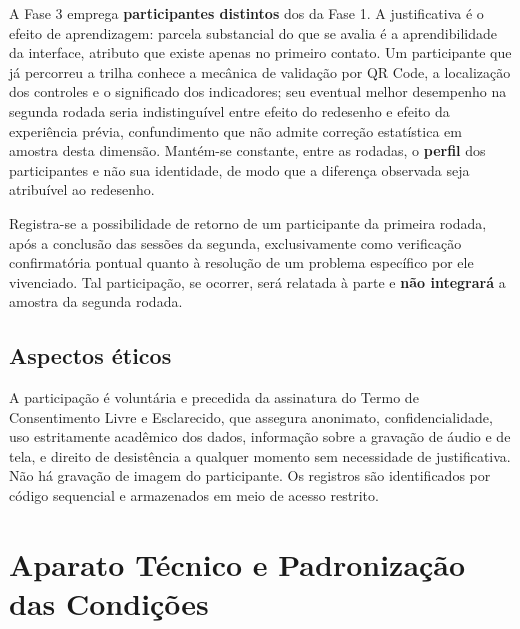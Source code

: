 A Fase 3 emprega \textbf{participantes distintos} dos da Fase 1. A justificativa é
o efeito de aprendizagem: parcela substancial do que se avalia é a
aprendibilidade da interface, atributo que existe apenas no primeiro contato. Um
participante que já percorreu a trilha conhece a mecânica de validação por QR
Code, a localização dos controles e o significado dos indicadores; seu eventual
melhor desempenho na segunda rodada seria indistinguível entre efeito do
redesenho e efeito da experiência prévia, confundimento que não admite correção
estatística em amostra desta dimensão. Mantém-se constante, entre as rodadas, o
\textbf{perfil} dos participantes e não sua identidade, de modo que a diferença
observada seja atribuível ao redesenho.

Registra-se a possibilidade de retorno de um participante da primeira rodada, após
a conclusão das sessões da segunda, exclusivamente como verificação confirmatória
pontual quanto à resolução de um problema específico por ele vivenciado. Tal
participação, se ocorrer, será relatada à parte e \textbf{não integrará} a amostra
da segunda rodada.

\subsection{Aspectos éticos}

A participação é voluntária e precedida da assinatura do Termo de Consentimento
Livre e Esclarecido, que assegura anonimato, confidencialidade, uso estritamente
acadêmico dos dados, informação sobre a gravação de áudio e de tela, e direito de
desistência a qualquer momento sem necessidade de justificativa. Não há gravação
de imagem do participante. Os registros são identificados por código sequencial e
armazenados em meio de acesso restrito.


\section{Aparato Técnico e Padronização das Condições}
\label{sec:aparato}

